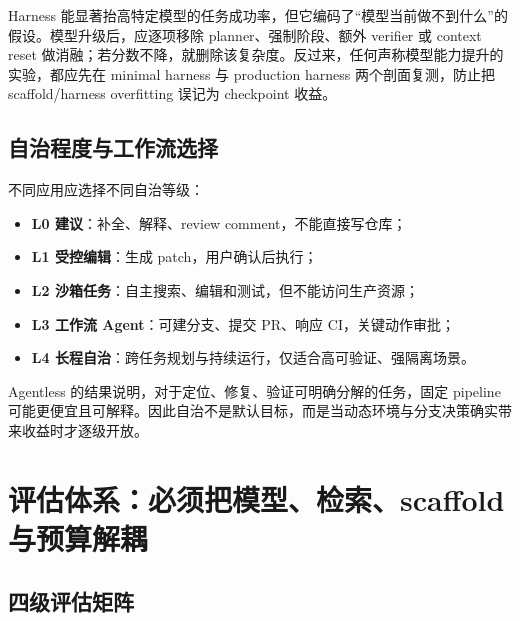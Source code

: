 \documentclass[10pt,a4paper,UTF8,fontset=none]{ctexart}
\begin{document}
\begin{keybox}
Harness 能显著抬高特定模型的任务成功率，但它编码了“模型当前做不到什么”的假设。模型升级后，应逐项移除 planner、强制阶段、额外 verifier 或 context reset 做消融；若分数不降，就删除该复杂度。反过来，任何声称模型能力提升的实验，都应先在 minimal harness 与 production harness 两个剖面复测，防止把 scaffold/harness overfitting 误记为 checkpoint 收益。
\end{keybox}

\subsection{自治程度与工作流选择}

不同应用应选择不同自治等级：

\begin{itemize}
  \item \textbf{L0 建议}：补全、解释、review comment，不能直接写仓库；
  \item \textbf{L1 受控编辑}：生成 patch，用户确认后执行；
  \item \textbf{L2 沙箱任务}：自主搜索、编辑和测试，但不能访问生产资源；
  \item \textbf{L3 工作流 Agent}：可建分支、提交 PR、响应 CI，关键动作审批；
  \item \textbf{L4 长程自治}：跨任务规划与持续运行，仅适合高可验证、强隔离场景。
\end{itemize}

Agentless 的结果说明，对于定位、修复、验证可明确分解的任务，固定 pipeline 可能更便宜且可解释\cite{zh:xia2024agentless}。因此自治不是默认目标，而是当动态环境与分支决策确实带来收益时才逐级开放。

\section{评估体系：必须把模型、检索、scaffold 与预算解耦}

\subsection{四级评估矩阵}
\end{document}
